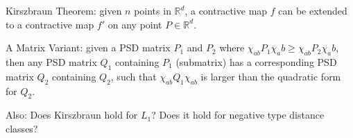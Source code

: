 Kirszbraun Theorem: given $n$ points in $\mathbb{R}^d$, a
contractive map $f$ can be extended to a contractive map $f'$ on
any point $P \in \mathbb{R}^d$.
 
A Matrix Variant: given a PSD matrix $P_1$ and $P_2$ where
$\chi_{ab}P_1\chi_ab \geq \chi_{ab}P_2 \chi_ab$, then any PSD
matrix $Q_1$ containing $P_1$ (submatrix) has a corresponding PSD matrix
$Q_2$ containing $Q_2$, such that $\chi_{ab} Q_1 \chi_{ab}$ is
larger than the quadratic form for $Q_2$.

Also: Does Kirszbraun hold for $L_1$? Does it hold for negative
type distance classes?
